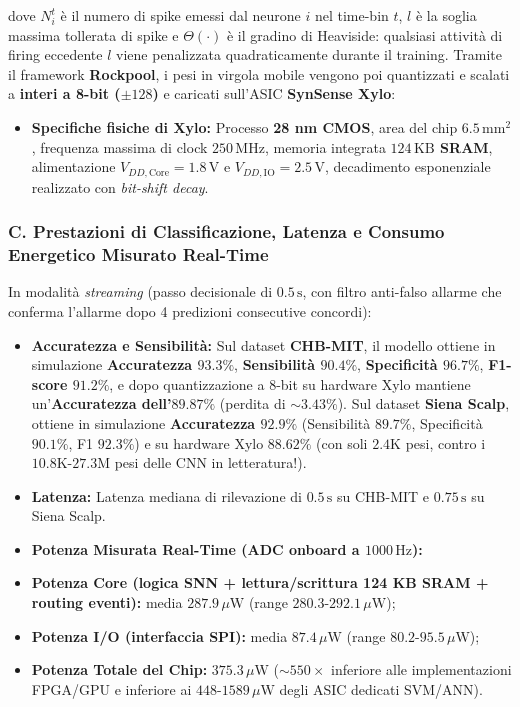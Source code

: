 \documentclass[11pt,a4paper]{article}
\begin{document}
dove $N_i^t$ è il numero di spike emessi dal neurone $i$ nel time-bin $t$, $l$ è la soglia massima tollerata di spike e $\Theta(\cdot)$ è il gradino di Heaviside: qualsiasi attività di firing eccedente $l$ viene penalizzata quadraticamente durante il training. Tramite il framework \textbf{Rockpool}, i pesi in virgola mobile vengono poi quantizzati e scalati a \textbf{interi a 8-bit ($\pm 128$)} e caricati sull'ASIC \textbf{SynSense Xylo}:
\begin{itemize}
  \item \textbf{Specifiche fisiche di Xylo:} Processo \textbf{28 nm CMOS}, area del chip \textbf{$6.5\,\text{mm}^2$}, frequenza massima di clock \textbf{$250\,\text{MHz}$}, memoria integrata \textbf{$124\,\text{KB}$ SRAM}, alimentazione \textbf{$V_{DD,\text{Core}} = 1.8\,\text{V}$} e \textbf{$V_{DD,\text{IO}} = 2.5\,\text{V}$}, decadimento esponenziale realizzato con \textit{bit-shift decay}.
\end{itemize}

\subsubsection{C. Prestazioni di Classificazione, Latenza e Consumo Energetico Misurato Real-Time}
In modalità \textit{streaming} (passo decisionale di $0.5\,\text{s}$, con filtro anti-falso allarme che conferma l'allarme dopo 4 predizioni consecutive concordi):
\begin{itemize}
  \item \textbf{Accuratezza e Sensibilità:} Sul dataset \textbf{CHB-MIT}, il modello ottiene in simulazione \textbf{Accuratezza $93.3\%$}, \textbf{Sensibilità $90.4\%$}, \textbf{Specificità $96.7\%$}, \textbf{F1-score $91.2\%$}, e dopo quantizzazione a 8-bit su hardware Xylo mantiene un'\textbf{Accuratezza dell'$89.87\%$} (perdita di $\sim 3.43\%$). Sul dataset \textbf{Siena Scalp}, ottiene in simulazione \textbf{Accuratezza $92.9\%$} (Sensibilità $89.7\%$, Specificità $90.1\%$, F1 $92.3\%$) e su hardware Xylo \textbf{$88.62\%$} (con soli $2.4\text{K}$ pesi, contro i $10.8\text{K}\text{-}27.3\text{M}$ pesi delle CNN in letteratura!).
  \item \textbf{Latenza:} Latenza mediana di rilevazione di \textbf{$0.5\,\text{s}$} su CHB-MIT e \textbf{$0.75\,\text{s}$} su Siena Scalp.
  \item \textbf{Potenza Misurata Real-Time (ADC onboard a $1000\,\text{Hz}$):}
  \item \textbf{Potenza Core (logica SNN + lettura/scrittura 124 KB SRAM + routing eventi):} media \textbf{$287.9\,\mu\text{W}$} (range $280.3\text{-}292.1\,\mu\text{W}$);
  \item \textbf{Potenza I/O (interfaccia SPI):} media \textbf{$87.4\,\mu\text{W}$} (range $80.2\text{-}95.5\,\mu\text{W}$);
  \item \textbf{Potenza Totale del Chip:} \textbf{$375.3\,\mu\text{W}$} ($\sim 550\times$ inferiore alle implementazioni FPGA/GPU e inferiore ai $448\text{-}1589\,\mu\text{W}$ degli ASIC dedicati SVM/ANN).
\end{itemize}
\end{document}

